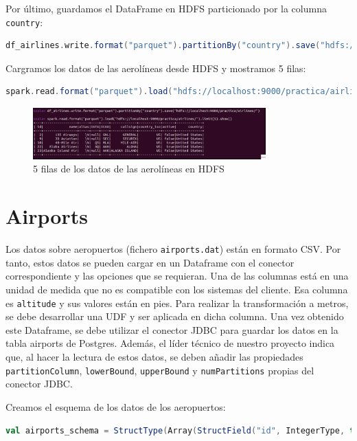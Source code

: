 Por último, guardamos el DataFrame en HDFS particionado por la columna \texttt{country}:

\begin{lstlisting}[language=scala]
df_airlines.write.format("parquet").partitionBy("country").save("hdfs://localhost:9000/practica/airlines/")
\end{lstlisting}

Cargramos los datos de las aerolíneas desde HDFS y mostramos 5 filas:

\begin{lstlisting}[language=scala]
spark.read.format("parquet").load("hdfs://localhost:9000/practica/airlines/").limit(5).show()
\end{lstlisting}

\begin{figure}[H]
    \centering
    \includegraphics[width=0.8\textwidth]{figures/41.png}
    \caption{5 filas de los datos de las aerolíneas en HDFS}
    \label{fig:airlines_hdfs_data}
\end{figure}

\section{Airports}

Los datos sobre aeropuertos (fichero \texttt{airports.dat}) están en formato CSV. Por tanto, estos datos se pueden cargar en un Dataframe con el conector correspondiente y las opciones que se requieran. Una de las columnas está en una unidad de medida que no es compatible con los sistemas del cliente. Esa columna es \texttt{altitude} y sus valores están en pies. Para realizar la transformación a metros, se debe desarrollar una UDF y ser aplicada en dicha columna. Una vez obtenido este Dataframe, se debe utilizar el conector JDBC para guardar los datos en la tabla airports de Postgres. Además, el líder técnico de nuestro proyecto indica que, al hacer la lectura de estos datos, se deben añadir las propiedades \texttt{partitionColumn}, \texttt{lowerBound}, \texttt{upperBound} y \texttt{numPartitions} propias del conector JDBC.

Creamos el esquema de los datos de los aeropuertos:

\begin{lstlisting}[language=scala]
val airports_schema = StructType(Array(StructField("id", IntegerType, true), StructField("name", StringType, true), StructField("city", StringType, true), StructField("country", StringType, true), StructField("IATA", StringType, true), StructField("ICAO", StringType, true), StructField("latitude", FloatType, true), StructField("longitude", FloatType, true), StructField("altitude", IntegerType, true), StructField("timeZone", FloatType, true), StructField("DST", StringType, true), StructField("tz_database", StringType, true), StructField("tipo", StringType, true), StructField("source", StringType, true)))
\end{lstlisting}

